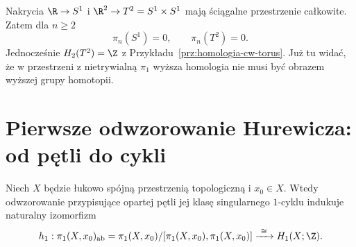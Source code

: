 \begin{przyklad}
\label{prz:pi-torus}
Nakrycia $\R\to S^1$ i
$\R^2\to T^2=S^1\times S^1$
mają ściągalne przestrzenie
całkowite. Zatem dla $n\geq2$
\[
 \pi_n(S^1)=0,\qquad
 \pi_n(T^2)=0.
\]
Jednocześnie
$H_2(T^2)=\Z$ z
Przykładu~\ref{prz:homologia-cw-torus}.
Już tu widać, że w
przestrzeni z nietrywialną
$\pi_1$ wyższa homologia
nie musi być obrazem
wyższej grupy homotopii.
\end{przyklad}

\section{Pierwsze odwzorowanie Hurewicza: od pętli do cykli}
\label{sec:hurewicz-jeden}

\begin{twierdzenie}
\label{thm:hurewicz-h1}
Niech $X$ będzie łukowo spójną przestrzenią topologiczną
i $x_0\in X$. Wtedy
odwzorowanie przypisujące opartej pętli
jej klasę singularnego
$1$-cyklu indukuje naturalny
izomorfizm
\[
 h_1:\pi_1(X,x_0)_{\mathrm{ab}}
 =\pi_1(X,x_0)/
 [\pi_1(X,x_0),\pi_1(X,x_0)]
 \xrightarrow{\ \cong\ }H_1(X;\Z).
\]
\end{twierdzenie}
